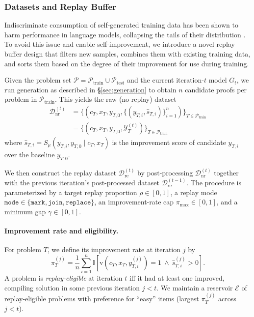 \subsubsection{Datasets and Replay Buffer}
\label{sec:training_replay}
Indiscriminate consumption of self-generated training data has been shown to harm performance in language models, collapsing the tails of their distribution \cite{modelCollapse}. To avoid this issue and enable self-improvement, we introduce a novel replay buffer design that filters new samples, combines them with existing training data, and sorts them based on the degree of their improvement for use during training.

Given the problem set $\mathcal{P} = \mathcal{P}_{\mathrm{train}} \cup \mathcal{P}_{\mathrm{test}}$ and the current iteration-$t$ model $G_t$, we run generation as described in \S\ref{sec:generation} to obtain $n$ candidate proofs per problem in $\mathcal{P}_{\mathrm{train}}$. This yields the raw (no-replay) dataset
\begin{align*}
    \mathcal{D}^{(t)}_{\mathrm{nr}}
    &= \{(c_T,x_T,y_{T,0},\{(y_{T,i},\widehat{s}_{T,i})\}_{i=1}^{n})\}_{T \in \mathcal{P}_{\mathrm{train}}} \\
    &= \{(c_T,x_T,y_{T,0},\mathcal{Y}_T^{(t)})\}_{T \in \mathcal{P}_{\mathrm{train}}}
\end{align*}
where $\widehat{s}_{T,i} = S_\mu(y_{T,i},y_{T,0}\mid c_T,x_T)$ is the improvement score of candidate $y_{T,i}$ over the baseline $y_{T,0}$.

We then construct the replay dataset $\mathcal{D}^{(t)}_{\mathrm{re}}$ by post-processing $\mathcal{D}^{(t)}_{\mathrm{nr}}$ together with the previous iteration's post-processed dataset $\mathcal{D}^{(t-1)}_{\mathrm{re}}$. The procedure is parameterized by a target replay proportion $\rho\in[0,1]$, a replay mode $\texttt{mode}\in\{\texttt{mark},\texttt{join},\texttt{replace}\}$, an improvement-rate cap $\pi_{\max}\in[0,1]$, and a minimum gap $\gamma \in [0,1]$.

\paragraph{Improvement rate and eligibility.}
For problem $T$, we define its improvement rate at iteration $j$ by
\[
\pi_T^{(j)}=\frac{1}{n}\sum_{i=1}^n \mathbb{I}\!\left[\text{v}(c_T,x_T,y_{T,i}^{(j)})=1\ \wedge\ \widehat{s}_{T,i}^{(j)}>0\right].
\]
A problem is \emph{replay-eligible} at iteration $t$ iff it had at least one improved, compiling solution in some previous iteration $j<t$. We maintain a reservoir $\mathcal{E}$ of replay-eligible problems with preference for ``easy'' items (largest $\pi_T^{(j)}$ across $j<t$).

